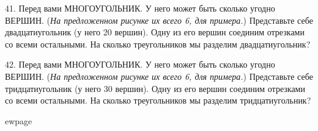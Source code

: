 41. Перед вами МНОГОУГОЛЬНИК. У него может быть сколько угодно ВЕРШИН. ({\it На предложенном рисунке их всего 6, для примера.}) Представьте себе двадцатиугольник (у него 20 вершин). Одну из его вершин соединим отрезками со всеми остальными. На сколько треугольников мы разделим двадцатиугольник?
\begin{center}
\begin{figure}[ht!]
\end{figure}
\end{center}
42. Перед вами МНОГОУГОЛЬНИК. У него может быть сколько угодно ВЕРШИН. ({\it На предложенном рисунке их всего 6, для примера.}) Представьте себе тридцатиугольник (у него 30 вершин). Одну из его вершин соединим отрезками со всеми остальными. На сколько треугольников мы разделим тридцатиугольник?
\begin{center}
\begin{figure}[ht!]
\end{figure}
\end{center}

ewpage

